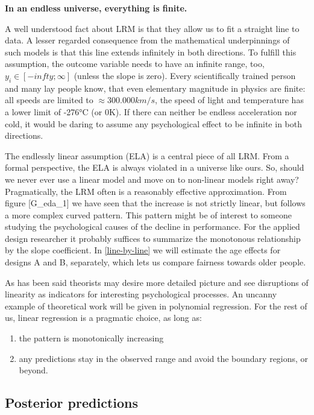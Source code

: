 \documentclass[]{svmono}
\providecommand{\tightlist}{%
  \setlength{\itemsep}{0pt}\setlength{\parskip}{0pt}}
\theoremstyle{definition}
\theoremstyle{definition}
\theoremstyle{definition}
\theoremstyle{remark}
\begin{document}
\textbf{In an endless universe, everything is finite.}

A well understood fact about LRM is that they allow us to fit a straight
line to data. A lesser regarded consequence from the mathematical
underpinnings of such models is that this line extends infinitely in
both directions. To fulfill this assumption, the outcome variable needs
to have an infinite range, too, \(y_i \in [-infty; \infty]\) (unless the
slope is zero). Every scientifically trained person and many lay people
know, that even elementary magnitude in physics are finite: all speeds
are limited to \(\approx 300.000 km/s\), the speed of light and
temperature has a lower limit of -276°C (or 0K). If there can neither be
endless acceleration nor cold, it would be daring to assume any
psychological effect to be infinite in both directions.

The endlessly linear assumption (ELA) is a central piece of all LRM.
From a formal perspective, the ELA is always violated in a universe like
ours. So, should we never ever use a linear model and move on to
non-linear models right away? Pragmatically, the LRM often is a
reasonably effective approximation. From figure {[}G\_eda\_1{]} we have
seen that the increase is not strictly linear, but follows a more
complex curved pattern. This pattern might be of interest to someone
studying the psychological causes of the decline in performance. For the
applied design researcher it probably suffices to summarize the
monotonous relationship by the slope coefficient. In \ref{line-by-line}
we will estimate the age effects for designs A and B, separately, which
lets us compare fairness towards older people.

As has been said theorists may desire more detailed picture and see
disruptions of linearity as indicators for interesting psychological
processes. An uncanny example of theoretical work will be given in
polynomial regression. For the rest of us, linear regression is a
pragmatic choice, as long as:

\begin{enumerate}
\def\labelenumi{\arabic{enumi}.}
\tightlist
\item
  the pattern is monotonically increasing
\item
  any predictions stay in the observed range and avoid the boundary
  regions, or beyond.
\end{enumerate}

\subsection{Posterior predictions}\label{posterior-predictions}
\end{document}
